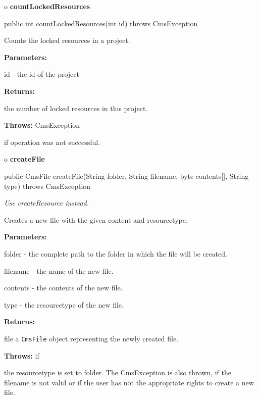o {\bf countLockedResources}

\begin{PRE}
 public int countLockedResources(int id) throws CmsException
\end{PRE}

\begin{description}
\htmlDD Counts the locked resources in a project.

\begin{description}
\item {\bf Parameters:}

id - the id of the project
\item {\bf Returns:}

the number of locked resources in this project.
\item {\bf Throws:} CmsException

if operation was not successful.
\end{description}

\end{description}

o {\bf createFile}

\begin{PRE}
 public CmsFile createFile(String folder,
                           String filename,
                           byte contents[],
                           String type) throws CmsException
\end{PRE}

\begin{description}
 {\it Use createResource
instead.}

Creates a new file with the given content and resourcetype.\htmlBR

\begin{description}
\item {\bf Parameters:}

folder - the complete path to the folder in which the file will be created.

filename - the name of the new file.

contents - the contents of the new file.

type - the resourcetype of the new file.
\item {\bf Returns:}

file a {\tt CmsFile} object representing the newly created file.
\item {\bf Throws:} if

the resourcetype is set to folder. The CmsException is also thrown, if the
filename is not valid or if the user has not the appropriate rights to create
a new file.
\end{description}

\end{description}

